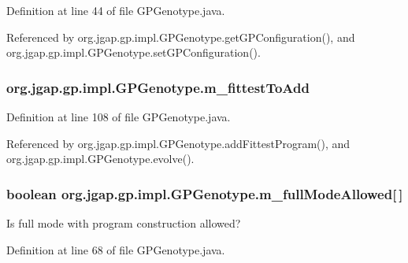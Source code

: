 Definition at line 44 of file G\-P\-Genotype.\-java.



Referenced by org.\-jgap.\-gp.\-impl.\-G\-P\-Genotype.\-get\-G\-P\-Configuration(), and org.\-jgap.\-gp.\-impl.\-G\-P\-Genotype.\-set\-G\-P\-Configuration().

\hypertarget{classorg_1_1jgap_1_1gp_1_1impl_1_1_g_p_genotype_af4a221f34692a5b47147dbbd31d26d23}{
\subsubsection[{m\-\_\-fittest\-To\-Add}]{ org.\-jgap.\-gp.\-impl.\-G\-P\-Genotype.\-m\-\_\-fittest\-To\-Add\hspace{0.3cm}{\ttfamily [private]}}}\label{classorg_1_1jgap_1_1gp_1_1impl_1_1_g_p_genotype_af4a221f34692a5b47147dbbd31d26d23}


Definition at line 108 of file G\-P\-Genotype.\-java.



Referenced by org.\-jgap.\-gp.\-impl.\-G\-P\-Genotype.\-add\-Fittest\-Program(), and org.\-jgap.\-gp.\-impl.\-G\-P\-Genotype.\-evolve().

\hypertarget{classorg_1_1jgap_1_1gp_1_1impl_1_1_g_p_genotype_a3bfbce17cabd5ef77caf8427f5511407}{
\subsubsection[{m\-\_\-full\-Mode\-Allowed}]{\setlength{\rightskip}{0pt plus 5cm}boolean org.\-jgap.\-gp.\-impl.\-G\-P\-Genotype.\-m\-\_\-full\-Mode\-Allowed\mbox{[}$\,$\mbox{]}\hspace{0.3cm}{\ttfamily [private]}}}\label{classorg_1_1jgap_1_1gp_1_1impl_1_1_g_p_genotype_a3bfbce17cabd5ef77caf8427f5511407}
Is full mode with program construction allowed? 

Definition at line 68 of file G\-P\-Genotype.\-java.



